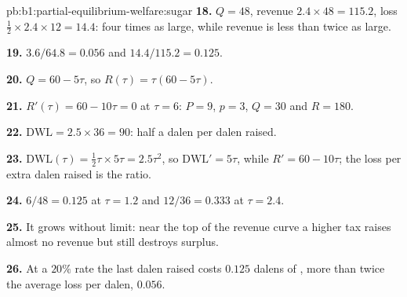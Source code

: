 \begin{solution}{pb:b1:partial-equilibrium-welfare:sugar}
\textbf{18.} $Q = 48$, revenue $2.4 \times 48 = 115.2$, loss $\tfrac12 \times 2.4 \times 12 = 14.4$: four times as
large, while revenue is less than twice as large.

\textbf{19.} $3.6/64.8 = 0.056$ and $14.4/115.2 = 0.125$.

\textbf{20.} $Q = 60 - 5\tau$, so $R(\tau) = \tau(60 - 5\tau)$.

\textbf{21.} $R'(\tau) = 60 - 10\tau = 0$ at $\tau = 6$: $P = 9$, $p = 3$, $Q = 30$ and $R = 180$.

\textbf{22.} $\mathrm{DWL} = 2.5 \times 36 = 90$: half a dalen per dalen raised.

\textbf{23.} $\mathrm{DWL}(\tau) = \tfrac12\tau \times 5\tau = 2.5\tau^2$, so $\mathrm{DWL}' = 5\tau$, while $R' = 60 - 10\tau$; the
loss per extra dalen raised is the ratio.

\textbf{24.} $6/48 = 0.125$ at $\tau = 1.2$ and $12/36 = 0.333$ at $\tau = 2.4$.

\textbf{25.} It grows without limit: near the top of the revenue curve a
higher tax raises almost no revenue but still destroys surplus.

\textbf{26.} At a $20\%$ rate the last dalen raised costs $0.125$ dalens of
, more than twice the average loss per dalen, $0.056$.
\end{solution}
